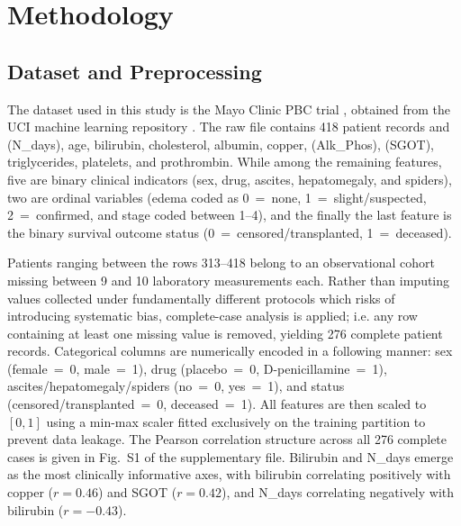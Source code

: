
\section{Methodology}
\label{sec:methodology}

\subsection{Dataset and Preprocessing}

The dataset used in this study is the Mayo Clinic PBC trial \cite{fleming1991}, obtained from the UCI machine learning repository \cite{ucipbc}. The raw file contains 418 patient records and   (N\_days), age, bilirubin, cholesterol, albumin, copper,  (Alk\_Phos),  (SGOT), triglycerides, platelets, and prothrombin. While among the remaining features, five are binary clinical indicators (sex, drug, ascites, hepatomegaly, and spiders), two are ordinal variables (edema coded as 0~=~none, 1~=~slight/suspected, 2~=~confirmed, and stage coded between 1--4), and the finally the last feature is the binary survival outcome status (0~=~censored/transplanted, 1~=~deceased).

Patients ranging between the rows 313--418 belong to an observational cohort missing between 9 and 10 laboratory measurements each. Rather than imputing values collected under fundamentally different protocols which risks of introducing systematic bias, complete-case analysis is applied; i.e. any row containing at least one missing value is removed, yielding 276 complete patient records. Categorical columns are numerically encoded in a following manner: sex (female~=~0, male~=~1), drug (placebo~=~0, D-penicillamine~=~1), ascites/hepatomegaly/spiders (no~=~0, yes~=~1), and status (censored/transplanted~=~0, deceased~=~1). All features are then scaled to $[0, 1]$ using a min-max scaler fitted exclusively on the training partition to prevent data leakage. The Pearson correlation structure across all 276 complete cases is given in Fig.~S1 of the supplementary file. Bilirubin and N\_days emerge as the most clinically informative axes, with bilirubin correlating positively with copper ($r = 0.46$) and SGOT ($r = 0.42$), and N\_days correlating negatively with bilirubin ($r = -0.43$).

